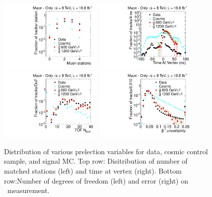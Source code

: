\begin{figure}
\centering
  \includegraphics[clip=true, trim=0.0cm 0cm 2.8cm 0cm, width=0.44\textwidth]{figures/muonly/Selection_Comp_8TeV_Cosmic_MatchedStations_BS}
  \includegraphics[clip=true, trim=0.0cm 0cm 2.8cm 0cm, width=0.44\textwidth]{figures/muonly/Selection_Comp_8TeV_Cosmic_TimeAtIP_BS} \\
  \includegraphics[clip=true, trim=0.0cm 0cm 2.8cm 0cm, width=0.44\textwidth]{figures/muonly/Selection_Comp_8TeV_Cosmic_nDof_BS}
  \includegraphics[clip=true, trim=0.0cm 0cm 2.8cm 0cm, width=0.44\textwidth]{figures/muonly/Selection_Comp_8TeV_Cosmic_TOFError_BS}
\caption{Distribution of various prelection variables for data, cosmic control sample, and signal MC.
Top row: Disitribution of number of matched stations (left) and time at vertex (right).
Bottom row:Number of degrees of freedom (left) and error (right) on \invbeta\ measurement.
    \label{fig:MuOnlyPreselA}}
\end{figure}

